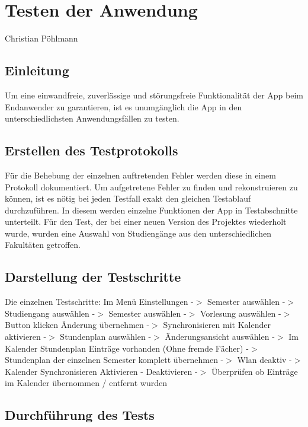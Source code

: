 \chapter{Testen der Anwendung}
Christian Pöhlmann
\section{Einleitung}
Um eine einwandfreie, zuverlässige und störungsfreie Funktionalität der App beim Endanwender zu garantieren, ist es unumgänglich die App in den unterschiedlichsten Anwendungsfällen zu testen.
\section{Erstellen des Testprotokolls}
Für die Behebung der einzelnen auftretenden Fehler werden diese in einem Protokoll dokumentiert. Um aufgetretene Fehler zu finden und rekonstruieren zu können, ist es nötig bei jeden Testfall exakt den gleichen Testablauf durchzuführen. In diesem werden einzelne Funktionen der App in Testabschnitte unterteilt. Für den Test, der bei einer neuen Version des Projektes wiederholt wurde, wurden eine Auswahl von Studiengänge aus den unterschiedlichen Fakultäten getroffen.
\section{Darstellung der Testschritte}
Die einzelnen Testschritte: \newline 
{} Im Menü Einstellungen -$>$ Semester auswählen -$>$ Studiengang auswählen -$>$ Semester auswählen 
-$>$ Vorlesung auswählen -$>$ Button klicken Änderung übernehmen -$>$ Synchronisieren mit Kalender aktivieren  -$>$ Stundenplan auswählen  -$>$ Änderungsansicht auswählen  -$>$ Im Kalender Stundenplan Einträge vorhanden (Ohne fremde Fächer) -$>$ Stundenplan der einzelnen Semester komplett übernehmen -$>$ Wlan deaktiv -$>$ Kalender Synchronisieren Aktivieren - Deaktivieren  -$>$ Überprüfen ob Einträge im Kalender übernommen / entfernt wurden\newline
\newpage
\section{Durchführung des Tests}

